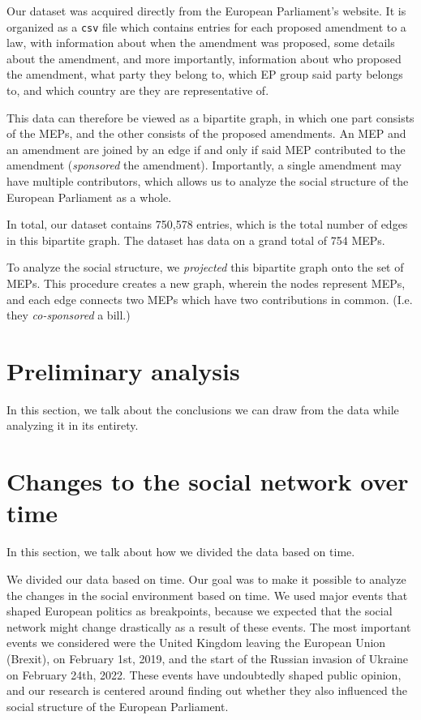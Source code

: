 \documentclass[lettersize,journal]{IEEEtran}
\begin{document}
Our dataset was acquired directly from the European Parliament's website. It is organized as a \texttt{csv} file which contains entries for each proposed amendment to a law, with information about when the amendment was proposed, some details about the amendment, and more importantly, information about who proposed the amendment, what party they belong to, which EP group said party belongs to, and which country are they are representative of.


This data can therefore be viewed as a bipartite graph, in which one part consists of the MEPs, and the other consists of the proposed amendments. An MEP and an amendment are joined by an edge if and only if said MEP contributed to the amendment (\textit{sponsored} the amendment). Importantly, a single amendment may have multiple contributors, which allows us to analyze the social structure of the European Parliament as a whole.

In total, our dataset contains 750,578 entries, which is the total number of edges in this bipartite graph. The dataset has data on a grand total of 754 MEPs. %

To analyze the social structure, we \textit{projected} this bipartite graph onto the set of MEPs. This procedure creates a new graph, wherein the nodes represent MEPs, and each edge connects two MEPs which have two contributions in common. (I.e. they \textit{co-sponsored} a bill.)


\section{Preliminary analysis}

In this section, we talk about the conclusions we can draw from the data while analyzing it in its entirety.

\section{Changes to the social network over time}

In this section, we talk about how we divided the data based on time.

We divided our data based on time. Our goal was to make it possible to analyze the changes in the social environment based on time. We used major events that shaped European politics as breakpoints, because we expected that the social network might change drastically as a result of these events. The most important events we considered were the United Kingdom leaving the European Union (Brexit), on February 1st, 2019, and the start of the Russian invasion of Ukraine on February 24th, 2022. These events have undoubtedly shaped public opinion, and our research is centered around finding out whether they also influenced the social structure of the European Parliament.
\end{document}
